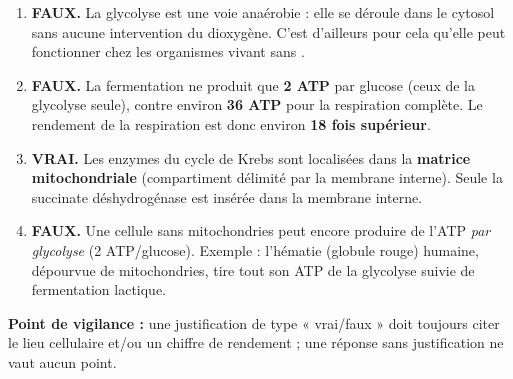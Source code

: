 \documentclass[11pt]{article}
\newcommand{\cle}[1]{{\popxbold\color{popdark}#1}}
\begin{document}
\begin{corrige}
\begin{enumerate}
\item \textbf{FAUX.} La glycolyse est une voie \cle{anaérobie} : elle se déroule dans le cytosol sans aucune intervention du dioxygène. C'est d'ailleurs pour cela qu'elle peut fonctionner chez les organismes vivant sans .
\item \textbf{FAUX.} La fermentation ne produit que \textbf{2 ATP} par glucose (ceux de la glycolyse seule), contre environ \textbf{36 ATP} pour la respiration complète. Le rendement de la respiration est donc environ \textbf{18 fois supérieur}.
\item \textbf{VRAI.} Les enzymes du \cle{cycle de Krebs} sont localisées dans la \textbf{matrice mitochondriale} (compartiment délimité par la membrane interne). Seule la succinate déshydrogénase est insérée dans la membrane interne.
\item \textbf{FAUX.} Une cellule sans mitochondries peut encore produire de l'ATP \emph{par glycolyse} (2 ATP/glucose). Exemple : l'\cle{hématie} (globule rouge) humaine, dépourvue de mitochondries, tire tout son ATP de la glycolyse suivie de fermentation lactique.
\end{enumerate}
\textbf{Point de vigilance :} une justification de type « vrai/faux » doit toujours citer le lieu cellulaire et/ou un chiffre de rendement ; une réponse sans justification ne vaut aucun point.
\end{corrige}
\end{document}
